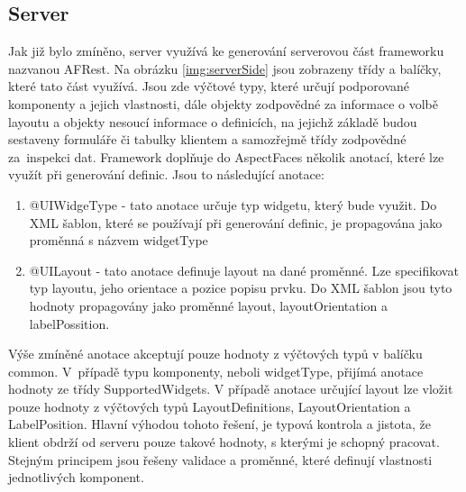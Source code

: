 \subsection{Server}
Jak již bylo zmíněno, server využívá ke generování serverovou část frameworku nazvanou AFRest. Na obrázku \ref{img:serverSide} jsou zobrazeny třídy a balíčky, které tato část využívá. Jsou zde výčtové typy, které určují podporované komponenty a jejich vlastnosti, dále objekty zodpovědné za informace o volbě layoutu a objekty nesoucí informace o definicích, na jejichž základě budou sestaveny formuláře či tabulky klientem a samozřejmě třídy zodpovědné za~inspekci dat. Framework doplňuje do AspectFaces několik anotací, které lze využít při generování definic. Jsou to následující anotace:
\begin{enumerate}
\item @UIWidgeType - tato anotace určuje typ widgetu, který bude využit. Do XML šablon, které se používají při generování definic, je propagována jako proměnná s názvem widgetType
\item @UILayout - tato anotace definuje layout na dané proměnné. Lze specifikovat typ layoutu, jeho orientace a pozice popisu prvku. Do XML šablon jsou tyto hodnoty propagovány jako proměnné layout, layoutOrientation a labelPossition. 
\end{enumerate}
Výše zmíněné anotace akceptují pouze hodnoty z výčtových typů v balíčku common. V~případě typu komponenty, neboli widgetType, přijímá anotace hodnoty ze třídy SupportedWidgets. V případě anotace určující layout lze vložit pouze hodnoty z výčtových typů LayoutDefinitions, LayoutOrientation a LabelPosition. Hlavní výhodou tohoto řešení, je typová kontrola a jistota, že klient obdrží od serveru pouze takové hodnoty, s kterými je schopný pracovat. Stejným principem jsou řešeny validace a proměnné, které definují vlastnosti jednotlivých komponent. 

